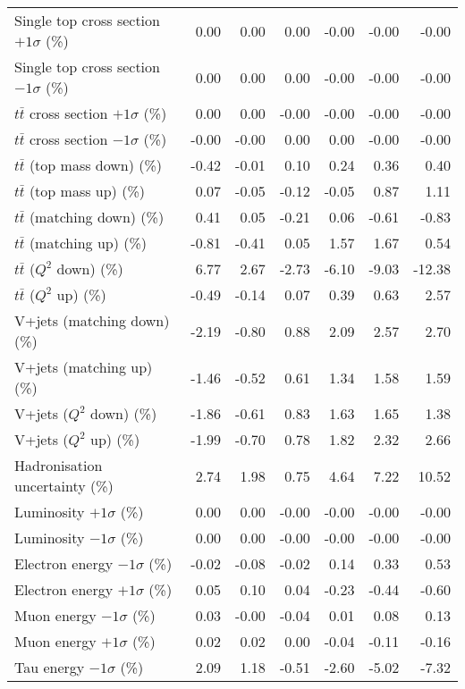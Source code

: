 \begin{table}[htbp]
{\begin{tabular}{lrrrrrr}
Single top cross section $+1\sigma$ (\%) & 0.00 & 0.00 & 0.00 & -0.00 & -0.00 & -0.00 \\ 
Single top cross section $-1\sigma$ (\%) & 0.00 & 0.00 & 0.00 & -0.00 & -0.00 & -0.00 \\ 
$t\bar{t}$ cross section $+1\sigma$ (\%) & 0.00 & 0.00 & -0.00 & -0.00 & -0.00 & -0.00 \\ 
$t\bar{t}$ cross section $-1\sigma$ (\%) & -0.00 & -0.00 & 0.00 & 0.00 & -0.00 & -0.00 \\ 
$t\bar{t}$ (top mass down) (\%) & -0.42 & -0.01 & 0.10 & 0.24 & 0.36 & 0.40 \\ 
$t\bar{t}$ (top mass up) (\%) & 0.07 & -0.05 & -0.12 & -0.05 & 0.87 & 1.11 \\ 
$t\bar{t}$ (matching down) (\%) & 0.41 & 0.05 & -0.21 & 0.06 & -0.61 & -0.83 \\ 
$t\bar{t}$ (matching up) (\%) & -0.81 & -0.41 & 0.05 & 1.57 & 1.67 & 0.54 \\ 
$t\bar{t}$ ($Q^{2}$ down) (\%) & 6.77 & 2.67 & -2.73 & -6.10 & -9.03 & -12.38 \\ 
$t\bar{t}$ ($Q^{2}$ up) (\%) & -0.49 & -0.14 & 0.07 & 0.39 & 0.63 & 2.57 \\ 
V+jets (matching down) (\%) & -2.19 & -0.80 & 0.88 & 2.09 & 2.57 & 2.70 \\ 
V+jets (matching up) (\%) & -1.46 & -0.52 & 0.61 & 1.34 & 1.58 & 1.59 \\ 
V+jets ($Q^{2}$ down) (\%) & -1.86 & -0.61 & 0.83 & 1.63 & 1.65 & 1.38 \\ 
V+jets ($Q^{2}$ up) (\%) & -1.99 & -0.70 & 0.78 & 1.82 & 2.32 & 2.66 \\ 
Hadronisation uncertainty (\%) & 2.74 & 1.98 & 0.75 & 4.64 & 7.22 & 10.52 \\ 
Luminosity $+1\sigma$ (\%) & 0.00 & 0.00 & -0.00 & -0.00 & -0.00 & -0.00 \\ 
Luminosity $-1\sigma$ (\%) & 0.00 & 0.00 & -0.00 & -0.00 & -0.00 & -0.00 \\ 
Electron energy $-1\sigma$ (\%) & -0.02 & -0.08 & -0.02 & 0.14 & 0.33 & 0.53 \\ 
Electron energy $+1\sigma$ (\%) & 0.05 & 0.10 & 0.04 & -0.23 & -0.44 & -0.60 \\ 
Muon energy $-1\sigma$ (\%) & 0.03 & -0.00 & -0.04 & 0.01 & 0.08 & 0.13 \\ 
Muon energy $+1\sigma$ (\%) & 0.02 & 0.02 & 0.00 & -0.04 & -0.11 & -0.16 \\ 
Tau energy $-1\sigma$ (\%) & 2.09 & 1.18 & -0.51 & -2.60 & -5.02 & -7.32 \\ 

\end{tabular}}
\end{table}
